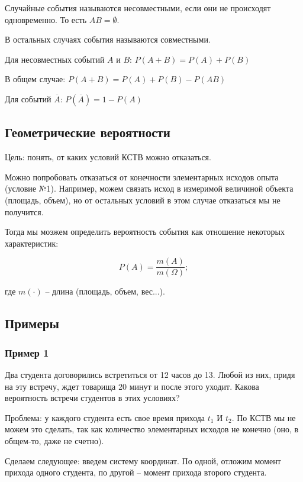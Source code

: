 \documentclass{article}
\begin{document}
Случайные события называются несовместными, если они не происходят одновременно. То есть $AB = \emptyset$.

В остальных случаях события называются совместными.

\quad

Для несовместных событий $A$ и $B$: $P(A + B) = P(A) + P(B)$

В общем случае: $P(A + B) = P(A) + P(B) - P(AB) $

Для событий $\overline A$: $P(\overline A) = 1 - P(A)$

\subsection{Геометрические вероятности}

Цель: понять, от каких условий КСТВ можно отказаться.

Можно попробовать отказаться от конечности элементарных исходов опыта (условие №1). Например, можем связать исход в измеримой величиной объекта (площадь, объем), но от остальных условий в этом случае отказаться мы не получится.

Тогда мы моэжем определить вероятность события как отношение некоторых характеристик:

$$ P(A) = \frac{m(A)}{m(\Omega)};$$

где $m(\cdot)$ -- длина (площадь, объем, вес...).

\subsection{Примеры}
\subsubsection{Пример 1}

Два студента договорились встретиться от 12 часов до 13. Любой из них, придя на эту встречу, ждет товарища 20 минут и после этого уходит. Какова вероятность встречи студентов в этих условиях?

Проблема: у каждого студента есть свое время прихода $t_1$ И $t_2$. По КСТВ мы не можем это сделать, так как количество элементарных исходов не конечно (оно, в общем-то, даже не счетно).

Сделаем следующее: введем систему координат. По одной, отложим момент прихода одного студента, по другой -- момент прихода второго студента.
\end{document}
